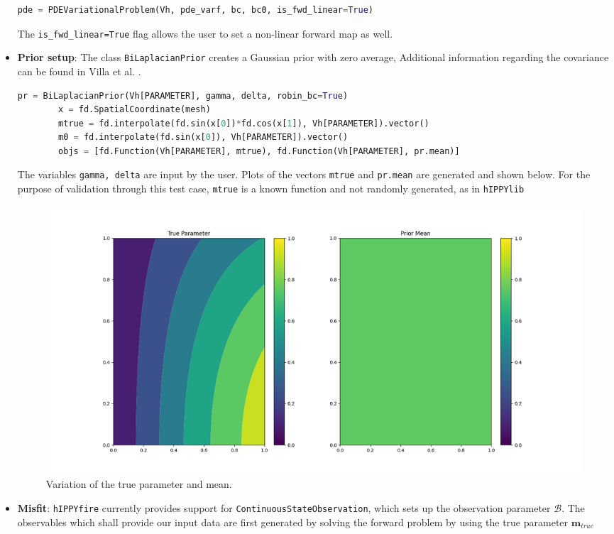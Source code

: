 \begin{itemize}
\begin{lstlisting}[language=python]
        pde = PDEVariationalProblem(Vh, pde_varf, bc, bc0, is_fwd_linear=True)
    \end{lstlisting}
    The \texttt{is\_fwd\_linear=True} flag allows the user to set a non-linear forward map as well.
    \item \textbf{Prior setup}: The class \texttt{BiLaplacianPrior} creates a Gaussian prior with zero average, Additional information regarding the covariance can be found in Villa et al. \cite{Villa_hIPPYlib_An_Extensible_2020}.
    \begin{lstlisting}[language=python]
        pr = BiLaplacianPrior(Vh[PARAMETER], gamma, delta, robin_bc=True)
        x = fd.SpatialCoordinate(mesh)
        mtrue = fd.interpolate(fd.sin(x[0])*fd.cos(x[1]), Vh[PARAMETER]).vector()
        m0 = fd.interpolate(fd.sin(x[0]), Vh[PARAMETER]).vector()
        objs = [fd.Function(Vh[PARAMETER], mtrue), fd.Function(Vh[PARAMETER], pr.mean)]
    \end{lstlisting}
    The variables \texttt{gamma, delta} are input by the user. Plots of the vectors \texttt{mtrue} and \texttt{pr.mean} are generated and shown below. For the purpose of validation through this test case, \texttt{mtrue} is a known function and not randomly generated, as in \texttt{hIPPYlib} \cite{Villa_hIPPYlib_An_Extensible_2020}
        \begin{figure}[th]
        \centering
        \includegraphics[width=1.0\textwidth]{figures/parameter.png}
        \caption{Variation of the true parameter and mean.}
        \label{figure:parameter}
        \end{figure}
    \item \textbf{Misfit}: \texttt{hIPPYfire} currently provides support for \texttt{ContinuousStateObservation}, which sets up the observation parameter $\mathcal{B}$. The observables which shall provide our input data are first generated by solving the forward problem by using the true parameter $\textbf{m}_{true}$

\end{itemize}
